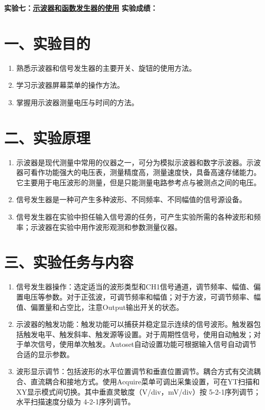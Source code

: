 \documentclass[12pt,a4paper]{article}
\begin{document}
\noindent
{\Large \textbf{实验七：}\underline{\textbf{示波器和函数发生器的使用}}} \hfill {\Large \textbf{实验成绩：}\underline{\hspace{3cm}}}
\vspace{0.5cm}

\section*{一、实验目的}
\begin{enumerate}
    \item 熟悉示波器和信号发生器的主要开关、旋钮的使用方法。
    \item 学习示波器屏幕菜单的操作方法。
    \item 掌握用示波器测量电压与时间的方法。
\end{enumerate}

\section*{二、实验原理}
\begin{enumerate}
    \item 示波器是现代测量中常用的仪器之一，可分为模拟示波器和数字示波器。示波器可看作功能强大的电压表，测量精度高，测量速度快，具备高速存储能力。它主要用于电压波形的测量，但是只能测量电路参考点与被测点之间的电压。
    \item 信号发生器是一种可产生多种波形、不同频率、不同幅值的信号源设备。
    \item 信号发生器在实验中担任输入信号源的任务，可产生实验所需的各种波形和频率；示波器在实验中用作波形观测和参数测量仪器。

\end{enumerate}

\section*{三、实验任务与内容}
\begin{enumerate}
    \item 信号发生器操作：选定适当的波形类型和CH1信号通道，调节频率、幅值、偏置电压等参数。对于正弦波，可调节频率和幅值；对于方波，可调节频率、幅值、偏置量和占空比，注意Output输出开关的状态。
    \item 示波器的触发功能：触发功能可以捕获并稳定显示连续的信号波形。触发器包括触发电平、触发斜率、触发源等设置。对于周期性信号，使用自动触发；对于单次信号，使用单次触发。Autoset自动设置功能可根据输入信号自动调节合适的显示参数。
    \item 波形显示调节：包括波形的水平位置调节和垂直位置调节。耦合方式有交流耦合、直流耦合和接地方式。使用Acquire菜单可调出采集设置，可在YT扫描和XY显示模式间切换。其中垂直灵敏度（V/div，mV/div）按 5-2-1序列调节；水平扫描速度分级为 4-2-1序列调节。

\end{enumerate}
\end{document}
